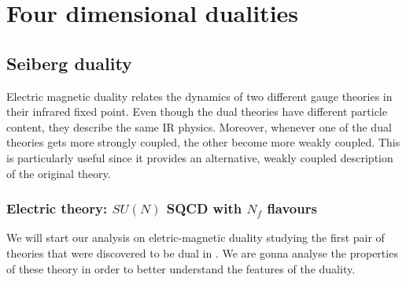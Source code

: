 
\chapter{Four dimensional dualities}



\section{Seiberg duality}
\label{sec:seiberg_duality_4d}
Electric magnetic duality relates the dynamics of two different gauge theories in their infrared fixed point.
Even though the dual theories have different particle content, they describe the same IR physics. 
Moreover, whenever one of the dual theories gets more strongly coupled, the other become more weakly coupled.
This is particularly useful since it provides an alternative, weakly coupled description of the original theory.




\subsection{Electric theory: $SU(N)$ SQCD with $N_f$ flavours }
We will start our analysis on eletric-magnetic duality studying the first pair of theories that were discovered to be dual in \cite{Seiberg:1994pq}.  
We are gonna analyse the properties of these theory in order to better understand the features of the duality.




